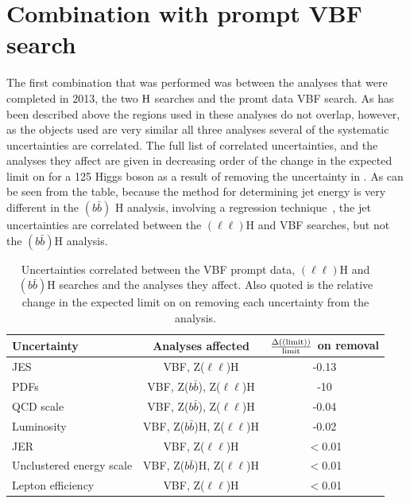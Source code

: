 \section{Combination with prompt VBF search}
\label{sec:combprompt}
The first combination that was performed was between the analyses that were completed in 2013, the two \PZ$\rm{H}$ searches and the promt data \ac{VBF} search. As has been described above the regions used in these analyses do not overlap, however, as the objects used are very similar all three analyses several of the systematic uncertainties are correlated. The full list of correlated uncertainties, and the analyses they affect are given in decreasing order of the change in the expected limit on \BRinv for a 125 \GeV Higgs boson as a result of removing the uncertainty in . As can be seen from the table, because the method for determining jet energy is very different in the \PZ$(b\bar{b})$ H analysis, involving a regression technique~\cite{CMS-PAS-HIG-13-028}, the jet uncertainties are correlated between the \PZ$(\ell\ell)$H and \ac{VBF} searches, but not the \PZ$(b\bar{b})$H analysis.

\begin{table}
  \caption{Uncertainties correlated between the \ac{VBF} prompt data, \PZ$(\ell\ell)$H and \PZ$(b\bar{b})$H searches and the analyses they affect. Also quoted is the relative change in the expected limit on \BRinv on removing each uncertainty from the analysis.}
  \label{tab:promptcorrs}
  \begin{tabular}{lcc}
    \hline
    \hline
    Uncertainty & Analyses affected & $\frac{\Delta(\rm(limit))}{\rm{limit}}$ on removal \\
    \hline
    \ac{JES} & VBF, Z($\ell\ell$)H & -0.13 \\
    PDFs & VBF, Z($b\bar{b}$), Z($\ell\ell$)H & -10 \\
    QCD scale & VBF, Z($b\bar{b}$), Z($\ell\ell$)H & -0.04\\
    Luminosity & VBF, Z($b\bar{b}$)H, Z($\ell\ell$)H & -0.02\\
    \ac{JER} & VBF, Z($\ell\ell$)H & $<$0.01\\
    Unclustered energy scale & VBF, Z($b\bar{b}$)H, Z($\ell\ell$)H & $<$0.01\\
    Lepton efficiency & VBF, Z($\ell\ell$)H & $<$0.01\\
    \hline
    \hline
  \end{tabular}
\end{table}

